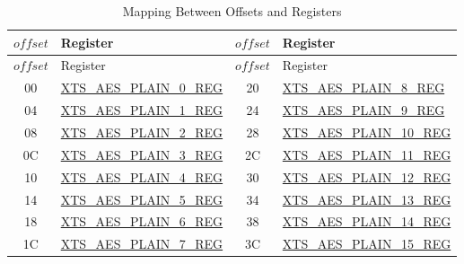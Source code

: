 \documentclass[main\_\_EN.tex]{subfiles}
\begin{document}
\begin{longtable}[c]
{ |c|p{4.5cm} |c|p{4.5cm}|}
\caption{Mapping Between Offsets and Registers}
\label{table:ManualEncryptionDataPadding}\\
\hline
\rowcolor{lightgray}
\begin{math} offset\end{math}&  Register  & \begin{math} offset\end{math} &  Register \\\hline
\endfirsthead
\hline
\rowcolor{lightgray}
\begin{math} offset\end{math}&  Register  & \begin{math} offset\end{math} &  Register \\\hline
\endhead
\endfoot
\hexprefix{}00 & \hyperref[regdesc:XTSAESPLAINNREG]{XTS\_AES\_PLAIN\_0\_REG} & \hexprefix{}20 & \hyperref[regdesc:XTSAESPLAINNREG]{XTS\_AES\_PLAIN\_8\_REG} \\\hline
\hexprefix{}04 & \hyperref[regdesc:XTSAESPLAINNREG]{XTS\_AES\_PLAIN\_1\_REG} & \hexprefix{}24 & \hyperref[regdesc:XTSAESPLAINNREG]{XTS\_AES\_PLAIN\_9\_REG} \\\hline
\hexprefix{}08 & \hyperref[regdesc:XTSAESPLAINNREG]{XTS\_AES\_PLAIN\_2\_REG} & \hexprefix{}28 & \hyperref[regdesc:XTSAESPLAINNREG]{XTS\_AES\_PLAIN\_10\_REG} \\\hline
\hexprefix{}0C & \hyperref[regdesc:XTSAESPLAINNREG]{XTS\_AES\_PLAIN\_3\_REG} & \hexprefix{}2C & \hyperref[regdesc:XTSAESPLAINNREG]{XTS\_AES\_PLAIN\_11\_REG} \\\hline
\hexprefix{}10 & \hyperref[regdesc:XTSAESPLAINNREG]{XTS\_AES\_PLAIN\_4\_REG} & \hexprefix{}30 & \hyperref[regdesc:XTSAESPLAINNREG]{XTS\_AES\_PLAIN\_12\_REG} \\\hline
\hexprefix{}14 & \hyperref[regdesc:XTSAESPLAINNREG]{XTS\_AES\_PLAIN\_5\_REG} & \hexprefix{}34 & \hyperref[regdesc:XTSAESPLAINNREG]{XTS\_AES\_PLAIN\_13\_REG} \\\hline
\hexprefix{}18 & \hyperref[regdesc:XTSAESPLAINNREG]{XTS\_AES\_PLAIN\_6\_REG} & \hexprefix{}38 & \hyperref[regdesc:XTSAESPLAINNREG]{XTS\_AES\_PLAIN\_14\_REG} \\\hline
\hexprefix{}1C & \hyperref[regdesc:XTSAESPLAINNREG]{XTS\_AES\_PLAIN\_7\_REG} & \hexprefix{}3C & \hyperref[regdesc:XTSAESPLAINNREG]{XTS\_AES\_PLAIN\_15\_REG} \\\hline
\end{longtable}
\end{document}
